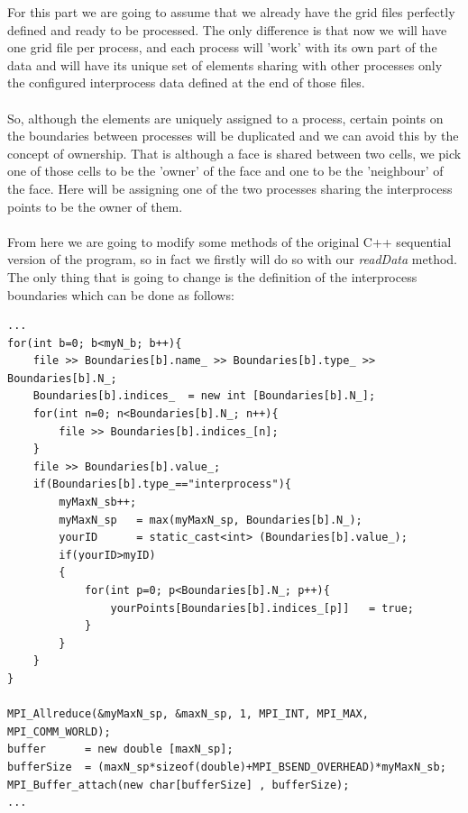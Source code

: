 \documentclass[12pt]{article}
\begin{document}
For this part we are going to assume that we already have the grid files perfectly defined and ready to be processed. The only difference is that now we will have one grid file per process, and each process will 'work' with its own part of the data and will have its unique set of elements sharing with other processes only the configured interprocess data defined at the end of those files.
\\\\
So, although the elements are uniquely assigned to a process, certain points on the boundaries between processes will be
duplicated and we can avoid this by the concept of ownership. That is although a face is shared between two cells, we pick one of those cells to be the 'owner' of the face and one to be the 'neighbour' of the face. Here will be assigning one of the two processes sharing the interprocess points to be the owner of them.
\\\\
From here we are going to modify some methods of the original C++ sequential version of the program, so in fact we firstly will do so with our \textit{readData} method. The only thing that is going to change is the definition of the interprocess boundaries which can be done as follows:

\begin{lstlisting}[style=MyC++Style] 
...
for(int b=0; b<myN_b; b++){
	file >> Boundaries[b].name_ >> Boundaries[b].type_ >> Boundaries[b].N_;
	Boundaries[b].indices_  = new int [Boundaries[b].N_];
	for(int n=0; n<Boundaries[b].N_; n++){
		file >> Boundaries[b].indices_[n];
	}
	file >> Boundaries[b].value_;
	if(Boundaries[b].type_=="interprocess"){
		myMaxN_sb++;
		myMaxN_sp	= max(myMaxN_sp, Boundaries[b].N_);
		yourID		= static_cast<int> (Boundaries[b].value_);
		if(yourID>myID)
		{
			for(int p=0; p<Boundaries[b].N_; p++){
				yourPoints[Boundaries[b].indices_[p]]	= true;
			}
		}
	}
}

MPI_Allreduce(&myMaxN_sp, &maxN_sp, 1, MPI_INT, MPI_MAX, MPI_COMM_WORLD);
buffer		= new double [maxN_sp];
bufferSize	= (maxN_sp*sizeof(double)+MPI_BSEND_OVERHEAD)*myMaxN_sb;
MPI_Buffer_attach(new char[bufferSize] , bufferSize);
...
\end{lstlisting}
\end{document}
